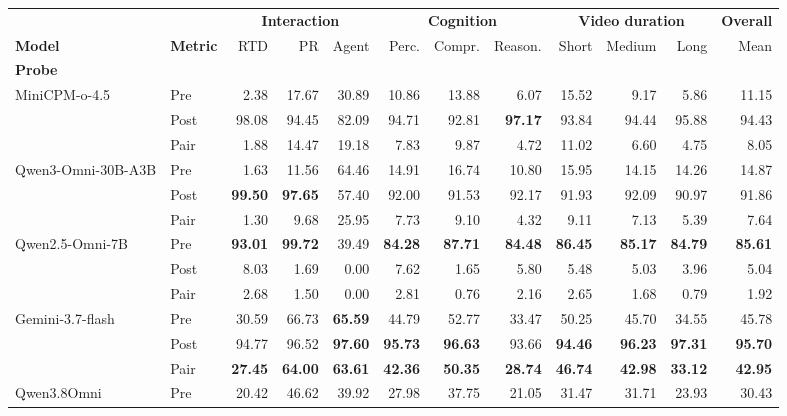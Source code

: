 \begin{table}[t]
\centering
{\small
\setlength{\tabcolsep}{3pt}
\begin{tabular}{ll*{10}{r}}
\hline
 & & \multicolumn{3}{c}{\textbf{Interaction}} & \multicolumn{3}{c}{\textbf{Cognition}} & \multicolumn{3}{c}{\textbf{Video duration}} & \textbf{Overall} \\
\cline{3-5}\cline{6-8}\cline{9-11}
\textbf{Model} & \textbf{Metric} & RTD & PR & Agent & Perc. & Compr. & Reason. & Short & Medium & Long & Mean \\
\hline
\multicolumn{12}{l}{\textbf{Probe}} \\
\hline
MiniCPM-o-4.5 & Pre & 2.38 & 17.67 & 30.89 & 10.86 & 13.88 & 6.07 & 15.52 & 9.17 & 5.86 & 11.15 \\
 & Post & 98.08 & 94.45 & 82.09 & 94.71 & 92.81 & \textbf{97.17} & 93.84 & 94.44 & 95.88 & 94.43 \\
 & Pair & 1.88 & 14.47 & 19.18 & 7.83 & 9.87 & 4.72 & 11.02 & 6.60 & 4.75 & 8.05 \\
Qwen3-Omni-30B-A3B & Pre & 1.63 & 11.56 & 64.46 & 14.91 & 16.74 & 10.80 & 15.95 & 14.15 & 14.26 & 14.87 \\
 & Post & \textbf{99.50} & \textbf{97.65} & 57.40 & 92.00 & 91.53 & 92.17 & 91.93 & 92.09 & 90.97 & 91.86 \\
 & Pair & 1.30 & 9.68 & 25.95 & 7.73 & 9.10 & 4.32 & 9.11 & 7.13 & 5.39 & 7.64 \\
Qwen2.5-Omni-7B & Pre & \textbf{93.01} & \textbf{99.72} & 39.49 & \textbf{84.28} & \textbf{87.71} & \textbf{84.48} & \textbf{86.45} & \textbf{85.17} & \textbf{84.79} & \textbf{85.61} \\
 & Post & 8.03 & 1.69 & 0.00 & 7.62 & 1.65 & 5.80 & 5.48 & 5.03 & 3.96 & 5.04 \\
 & Pair & 2.68 & 1.50 & 0.00 & 2.81 & 0.76 & 2.16 & 2.65 & 1.68 & 0.79 & 1.92 \\
Gemini-3.7-flash & Pre & 30.59 & 66.73 & \textbf{65.59} & 44.79 & 52.77 & 33.47 & 50.25 & 45.70 & 34.55 & 45.78 \\
 & Post & 94.77 & 96.52 & \textbf{97.60} & \textbf{95.73} & \textbf{96.63} & 93.66 & \textbf{94.46} & \textbf{96.23} & \textbf{97.31} & \textbf{95.70} \\
 & Pair & \textbf{27.45} & \textbf{64.00} & \textbf{63.61} & \textbf{42.36} & \textbf{50.35} & \textbf{28.74} & \textbf{46.74} & \textbf{42.98} & \textbf{33.12} & \textbf{42.95} \\
Qwen3.8Omni & Pre & 20.42 & 46.62 & 39.92 & 27.98 & 37.75 & 21.05 & 31.47 & 31.71 & 23.93 & 30.43 \\

\end{tabular}}
\end{table}
